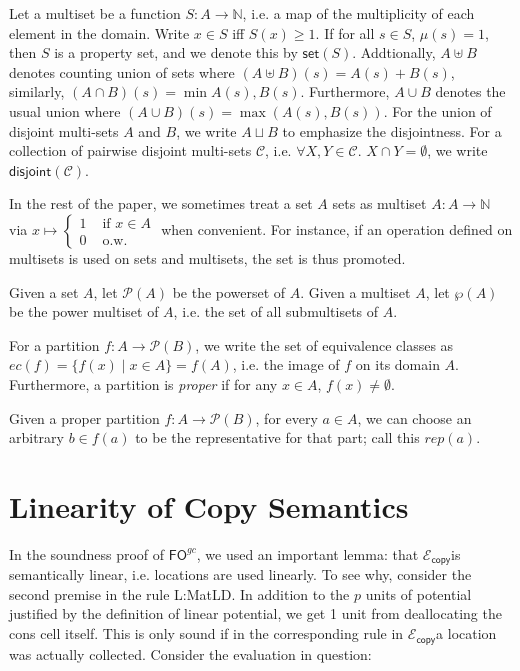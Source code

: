 \documentclass{easychair}
\newcommand{\ms}[1]{\ensuremath{\mathsf{#1}}}
\newcounter{rule}
\newcommand{\dist}[1]{\mathsf{disjoint}(#1)}
\newcommand{\fogc}{\ms{FO}^{gc}}
\newcommand{\copySem}{\ensuremath{\mathcal{E}_{\ms{copy}}}}
\theoremstyle{definition}
\begin{document}
Let a multiset be a function $S : A \to \mathbb{N}$, i.e. a map of the multiplicity of each element in the domain.  Write $x \in S$ iff $S(x) \ge 1$. If for all  $s \in S$, $\mu(s) = 1$, then $S$ 
is a property set, and we denote this by $\ms{set}(S)$. Addtionally, $A \uplus B$ denotes 
counting union of sets where $(A \uplus B) (s) = A (s) + B(s)$, similarly, 
$(A \cap B)(s) = \min{A(s),B(s)}$. Furthermore, $A \cup B$ denotes the usual union where 
$(A \cup B)(s) = \max{(A(s),B(s))}$.  For the union of disjoint multi-sets $A$ and $B$, 
we write $A \sqcup B$ to emphasize the disjointness.  For a collection of pairwise disjoint 
multi-sets $\mathcal{C}$, i.e. $\forall X,Y \in \mathcal{C}$. $X \cap Y = \emptyset$, we write $\dist{\mathcal{C}}$.

In the rest of the paper, 
we sometimes treat a set $A$ sets as multiset $A : A \to \mathbb{N}$ via 
$x \mapsto \begin{cases} 1 &\text{ if } x \in A \\0 &\text{ o.w.}\end{cases}$ when convenient. 
For instance, if an operation defined on multisets is used on sets and multisets, the set 
is thus promoted.

Given a set $A$, let $\mathcal{P}(A)$ be the powerset of $A$. Given a multiset $A$, let 
$\wp(A)$ be the power multiset of $A$, i.e. the set of all submultisets of $A$.

For a partition $f : A \to \mathcal{P}(B)$, we write the set of equivalence classes
as $ec(f) = \{f(x) \mid x \in A\} = f(A)$, i.e. the image of $f$ on its domain $A$.
Furthermore, a partition is \emph{proper} if for any $x \in A$, $f(x) \neq \emptyset$.

Given a proper partition $f : A \to \mathcal{P}(B)$, for every $a \in A$, 
we can choose an arbitrary 
$b \in f(a)$ to be the representative for that part; call this $rep(a)$.

\section{Linearity of Copy Semantics}

In the soundness proof of $\fogc$, we used an important lemma: that \copySem is 
semantically linear, i.e. locations are used linearly. 
To see why, consider the second premise in the rule L:MatLD. In addition to the 
$p$ units of potential justified by the definition of linear potential, we get 1 unit 
from deallocating the cons cell itself. This is only sound if in the corresponding rule in 
\copySem a location was actually collected. Consider the evaluation in question:
\end{document}

